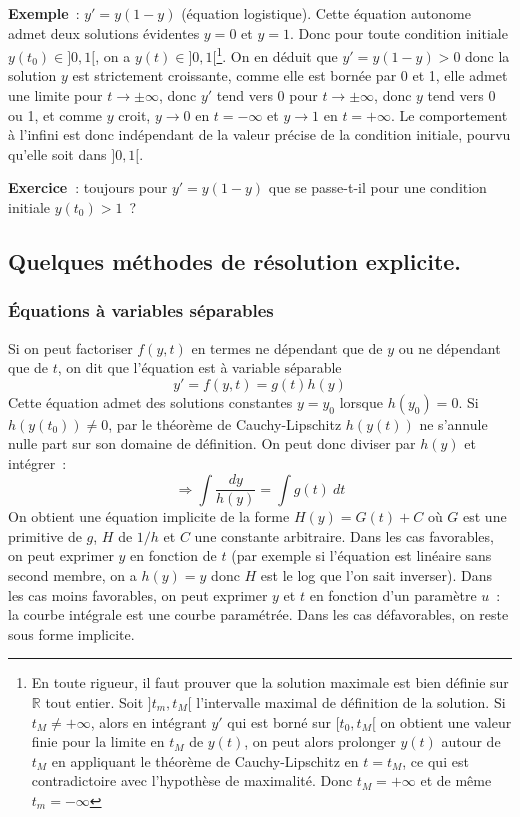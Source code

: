 \documentclass[a4paper,11pt]{article}
\begin{document}
\begin{giacjshere}
{\bf Exemple}~: $y'=y(1-y)$ (\'equation logistique). 
Cette \'equation autonome admet deux solutions
\'evidentes $y=0$ et $y=1$. Donc pour toute condition initiale $y(t_0)
\in ]0,1[$, on a $y(t) \in ]0,1[$\footnote{En toute rigueur,
il faut prouver que la solution maximale est bien d\'efinie sur
$\mathbb{R}$ tout entier. Soit $]t_m,t_M[$ l'intervalle maximal de
d\'efinition de la solution. Si $t_M \neq +\infty$,
alors en int\'egrant $y'$ qui est born\'e sur $[t_0,t_M[$ 
on obtient une valeur finie pour la limite en $t_M$ de $y(t)$,
on peut alors prolonger $y(t)$ autour de $t_M$
en appliquant le th\'eor\`eme de Cauchy-Lipschitz en $t=t_M$,
ce qui est contradictoire avec l'hypoth\`ese de maximalit\'e. 
Donc $t_M=+\infty$ et de m\^eme $t_m=-\infty$}. 
On en d\'eduit que $y'=y(1-y)>0$
donc la solution $y$ est strictement croissante, comme elle est
born\'ee par 0 et 1, elle admet une limite pour $t \rightarrow \pm
\infty$, donc $y'$ tend vers 0 pour $t \rightarrow \pm
\infty$, donc $y$ tend vers 0 ou 1, et comme $y$ croit, 
$y \rightarrow 0$ en $t=-\infty$ et $y \rightarrow 1$ en $t=+\infty$.
Le comportement \`a l'infini est donc ind\'ependant de la valeur
pr\'ecise de la condition initiale, pourvu qu'elle soit dans $]0,1[$.

{\bf Exercice~}: toujours pour $y'=y(1-y)$ que se passe-t-il pour une
condition initiale $y(t_0)>1$~?

\subsection{Quelques m\'ethodes de r\'esolution explicite.}

\subsubsection{\'Equations \`a variables
  s\'eparables}
Si on peut factoriser $f(y,t)$ en termes ne d\'ependant que
de $y$ ou ne d\'ependant que de $t$, on dit que l'\'equation
est \`a variable s\'eparable $$y'=f(y,t)=g(t)h(y)$$
Cette \'equation admet des solutions constantes $y=y_0$ lorsque
$h(y_0)=0$. Si $h(y(t_0)) \neq 0$, par le th\'eor\`eme de
Cauchy-Lipschitz $h(y(t))$ ne s'annule nulle part sur son domaine
de d\'efinition. On peut donc diviser par $h(y)$ et 
int\'egrer~:
$$ \Rightarrow \int \frac{dy}{h(y)} = \int g(t) \ 
dt$$
On obtient une \'equation implicite de la forme $H(y)=G(t)+C$ o\`u
$G$ est une primitive de $g$, $H$ de $1/h$ et $C$ une constante
arbitraire. Dans les cas favorables, on peut exprimer $y$ en fonction
de $t$ (par exemple si l'\'equation est lin\'eaire sans second membre,
on a $h(y)=y$ donc $H$ est le log que l'on sait
inverser). Dans les cas moins favorables, on peut exprimer $y$ et
$t$ en fonction d'un param\`etre $u$~: la courbe int\'egrale est
une courbe param\'etr\'ee. Dans les cas d\'efavorables, on reste
sous forme implicite.


\end{giacjshere}
\end{document}
